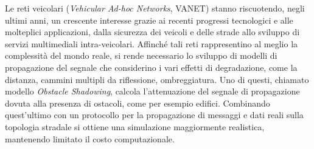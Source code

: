 
Le reti veicolari (\textit{Vehicular Ad-hoc Networks}, VANET) stanno riscuotendo, negli ultimi anni, un crescente interesse
grazie ai recenti progressi tecnologici e alle molteplici applicazioni, dalla sicurezza dei veicoli e delle strade allo sviluppo di servizi
multimediali intra-veicolari.
Affinché tali reti rappresentino al meglio la complessità del mondo reale, si rende necessario lo sviluppo di modelli di propagazione del segnale
che considerino i vari effetti di degradazione, come la distanza, cammini multipli da riflessione, ombreggiatura.
Uno di questi, chiamato modello \textit{Obstacle Shadowing}, calcola l'attenuazione del segnale di propagazione dovuta alla presenza di ostacoli, come per esempio edifici.
Combinando quest'ultimo con un protocollo per la propagazione di messaggi e dati reali sulla topologia stradale si ottiene una simulazione maggiormente realistica,
mantenendo limitato il costo computazionale.
%
